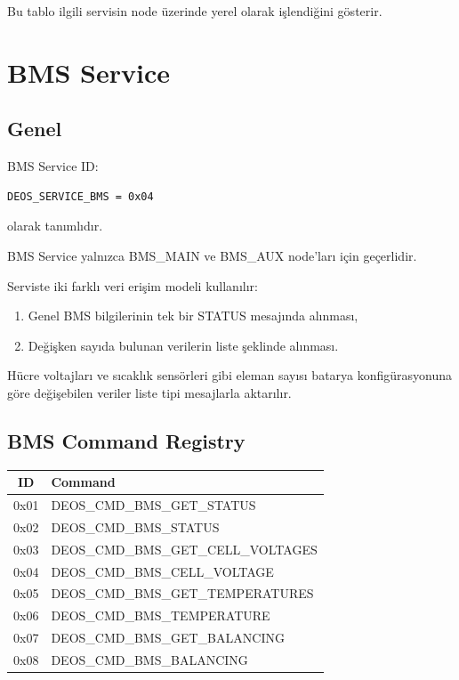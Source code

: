 \documentclass[a4paper,10pt]{article}
\begin{document}
Bu tablo ilgili servisin node üzerinde yerel olarak işlendiğini
gösterir.

\section{BMS Service}

\subsection{Genel}

BMS Service ID:

\begin{lstlisting}
DEOS_SERVICE_BMS = 0x04
\end{lstlisting}

olarak tanımlıdır.

BMS Service yalnızca BMS\_MAIN ve BMS\_AUX node'ları için geçerlidir.

Serviste iki farklı veri erişim modeli kullanılır:

\begin{enumerate}[nosep]
    \item Genel BMS bilgilerinin tek bir STATUS mesajında alınması,
    \item Değişken sayıda bulunan verilerin liste şeklinde alınması.
\end{enumerate}

Hücre voltajları ve sıcaklık sensörleri gibi eleman sayısı batarya
konfigürasyonuna göre değişebilen veriler liste tipi mesajlarla
aktarılır.

\subsection{BMS Command Registry}

\begin{center}
\begin{tabular}{c l}
\toprule
\textbf{ID} & \textbf{Command} \\
\midrule

0x01 & DEOS\_CMD\_BMS\_GET\_STATUS \\
0x02 & DEOS\_CMD\_BMS\_STATUS \\

0x03 & DEOS\_CMD\_BMS\_GET\_CELL\_VOLTAGES \\
0x04 & DEOS\_CMD\_BMS\_CELL\_VOLTAGE \\

0x05 & DEOS\_CMD\_BMS\_GET\_TEMPERATURES \\
0x06 & DEOS\_CMD\_BMS\_TEMPERATURE \\

0x07 & DEOS\_CMD\_BMS\_GET\_BALANCING \\
0x08 & DEOS\_CMD\_BMS\_BALANCING \\

\bottomrule
\end{tabular}
\end{center}
\end{document}
